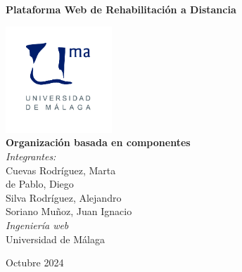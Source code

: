 \documentclass{article}
\begin{document}
	
	\begin{titlepage}
		\centering
		\vspace*{3cm}
		
		{\Huge \textbf{Plataforma Web de Rehabilitación a Distancia}\\[0.5cm]}
		
		\vspace{2cm}
		\includegraphics[width=0.3\textwidth]{images/uma_logo.jpg}\\[1cm]
		
		{\LARGE \textbf{Organización basada en componentes}\\[0.5cm]}
		{\large \textit{Integrantes:}\\
			Cuevas Rodríguez, Marta\\
			de Pablo, Diego\\
			Silva Rodríguez, Alejandro\\
			Soriano Muñoz, Juan Ignacio\\
		}
		\vfill
		{\large \textit{Ingeniería web}\\
			Universidad de Málaga\\
		}
		
		\vfill
		
		{\large Octubre 2024}
	\end{titlepage}
	
	\tableofcontents
	
	\newpage
	
\end{document}
